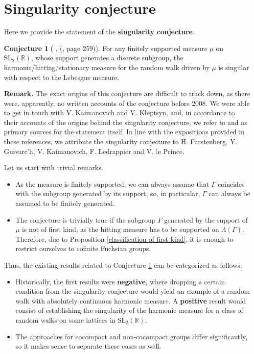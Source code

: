 \documentclass[11pt]{amsart}
\theoremstyle{definition}
\newtheorem{conjecture}{Conjecture}[section]
\begin{document}
			
	\section{Singularity conjecture}
	
	Here we provide the statement of the \textbf{singularity conjecture}.
	\begin{conjecture}[ \cite{MR2568439}, (\cite{kaimanovich2011matrix}, page 259)]
		\label{Fuchsian singularity conjecture}
		For any finitely supported measure $\mu$ on $\text{SL}_2(\mathbb{R})$, whose support generates a discrete subgroup, the harmonic/hitting/stationary measure for the random walk driven by $\mu$ is singular with respect to the Lebesgue measure.
	\end{conjecture}
	
	\textbf{Remark.} The exact origins of this conjecture are difficult to track down, as there were, apparently, no written accounts of the conjecture before 2008. We were able to get in touch with V. Kaimanovich and V. Kleptsyn, and, in accordance to their accounts of the origins behind the singularity conjecture, we refer to \cite{MR2568439} and \cite{kaimanovich2011matrix} as primary sources for the statement itself. In line with the expositions provided in these references, we attribute the singularity conjecture to H. Furstenberg, Y. Guivarc'h, V. Kaimanovich, F. Ledrappier and V. le Prince. 
	
	Let us start with trivial remarks.
	\begin{itemize}
		\item As the measure is finitely supported, we can always assume that $\Gamma$ coincides with the subgroup generated by its support, so, in particular, $\Gamma$ can always be assumed to be finitely generated.
		\item The conjecture is trivially true if the subgroup $\Gamma$ generated by the support of $\mu$ is not of first kind, as the hitting measure has to be supported on $\Lambda(\Gamma)$. Therefore, due to Proposition \ref{classification of first kind}, it is enough to restrict ourselves to cofinite Fuchsian groups.
	\end{itemize}
	Thus, the existing results related to Conjecture \ref{Fuchsian singularity conjecture} can be categorized as follows:
	
	\begin{itemize}
		\item Historically, the first results were \textbf{negative}, where dropping a certain condition from the singularity conjecture would yield an example of a random walk with absolutely continuous harmonic measure. A \textbf{positive} result would consist of establishing the singularity of the harmonic measure for a class of random walks on some lattices in $\text{SL}_2(\mathbb{R})$.
		\item The approaches for cocompact and non-cocompact groups differ significantly, so it makes sense to separate these cases as well.
	\end{itemize}
	
\end{document}
